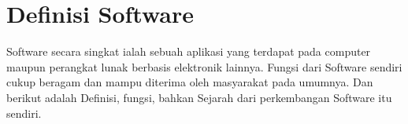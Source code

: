 



\section{Definisi Software}
Software secara singkat ialah sebuah aplikasi yang terdapat pada computer maupun perangkat lunak berbasis elektronik lainnya. Fungsi dari Software sendiri cukup beragam dan mampu diterima oleh masyarakat pada umumnya. Dan berikut adalah Definisi, fungsi, bahkan Sejarah dari perkembangan Software itu sendiri.

